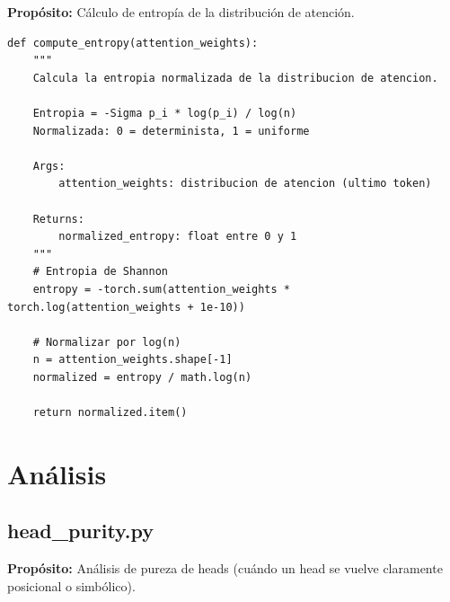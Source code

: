 \documentclass[12pt,a4paper]{report}
\begin{document}
\textbf{Propósito:} Cálculo de entropía de la distribución de atención.

\begin{lstlisting}
def compute_entropy(attention_weights):
    """
    Calcula la entropia normalizada de la distribucion de atencion.
    
    Entropia = -Sigma p_i * log(p_i) / log(n)
    Normalizada: 0 = determinista, 1 = uniforme
    
    Args:
        attention_weights: distribucion de atencion (ultimo token)
    
    Returns:
        normalized_entropy: float entre 0 y 1
    """
    # Entropia de Shannon
    entropy = -torch.sum(attention_weights * torch.log(attention_weights + 1e-10))
    
    # Normalizar por log(n)
    n = attention_weights.shape[-1]
    normalized = entropy / math.log(n)
    
    return normalized.item()
\end{lstlisting}

\section{Análisis}
\label{sec:analisis}

\subsection{head\_purity.py}
\label{subsec:head_purity}

\textbf{Propósito:} Análisis de pureza de heads (cuándo un head se vuelve claramente posicional o simbólico).
\end{document}
